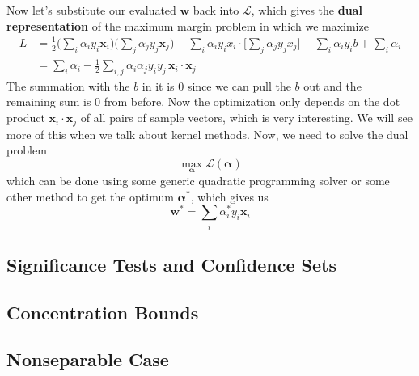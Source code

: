   Now let's substitute our evaluated $\mathbf{w}$ back into $\mathcal{L}$, which gives the \textbf{dual representation} of the maximum margin problem in which we maximize  
  \begin{align*} 
      L & = \frac{1}{2} \bigg( \sum_i \alpha_i y_i \mathbf{x}_i \bigg) \bigg( \sum_j \alpha_j y_j \mathbf{x}_j \bigg) - \sum_{i} \alpha_i y_i x_i \cdot \bigg[ \sum_j \alpha_j y_j x_j \bigg] - \sum_i \alpha_i y_i b + \sum_i \alpha_i \\ 
        & = \sum_i \alpha_i - \frac{1}{2} \sum_{i, j} \alpha_i \alpha_j y_i y_j \, \mathbf{x}_i \cdot \mathbf{x}_j 
  \end{align*}
  The summation with the $b$ in it is $0$ since we can pull the $b$ out and the remaining sum is $0$ from before. Now the optimization only depends on the dot product $\mathbf{x}_i \cdot \mathbf{x}_j$ of all pairs of sample vectors, which is very interesting. We will see more of this when we talk about kernel methods. Now, we need to solve the dual problem 
  \[\max_{\boldsymbol{\alpha}} \mathcal{L}(\boldsymbol{\alpha})\]
  which can be done using some generic quadratic programming solver or some other method to get the optimum $\boldsymbol{\alpha}^\ast$, which gives us 
  \[\mathbf{w}^\ast = \sum_i \alpha_i^\ast y_i \mathbf{x}_i\]

\subsection{Significance Tests and Confidence Sets}

\subsection{Concentration Bounds} 

\subsection{Nonseparable Case} 

